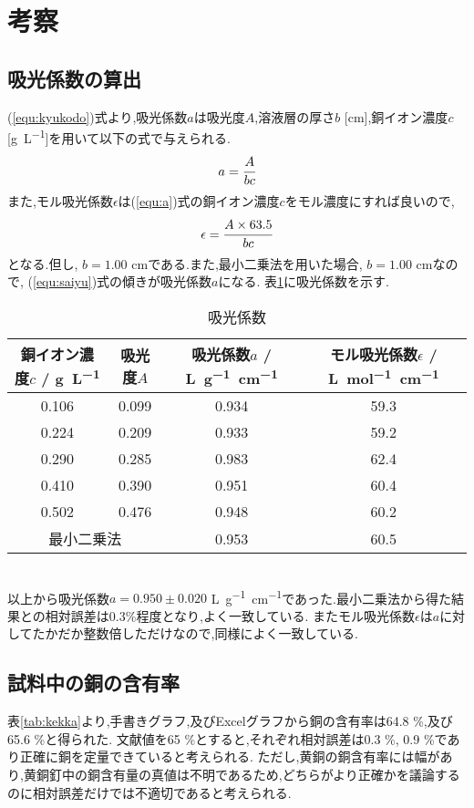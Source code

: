 \section{考察}
\subsection{吸光係数の算出}
\label{sec:kyuko}
(\ref{equ:kyukodo})式より,吸光係数$a$は吸光度$A$,溶液層の厚さ$b$ [\si{\centi\meter}],銅イオン濃度$c$ [\si{\gram.L^{-1}}]を用いて以下の式で与えられる.
\begin{align}
  \label{equ:a}
  a=\cfrac{A}{bc}
\end{align}
また,モル吸光係数$\epsilon$は(\ref{equ:a})式の銅イオン濃度$c$をモル濃度にすれば良いので,
\begin{align}
  \label{equ:epsilon}
  \epsilon=\cfrac{A\times63.5}{bc}
\end{align}
となる.但し, $b=1.00$ \si{\centi\meter}である.また,最小二乗法を用いた場合, $b=1.00$ \si{\centi\meter}なので, (\ref{equ:saiyu})式の傾きが吸光係数$a$になる.
表\ref{tab:kyukokeisu}に吸光係数を示す.
\begin{table}[h]
   \caption{吸光係数}
   \label{tab:kyukokeisu}
   \centering
   \begin{tabular}{cc|cc}
     \hline
     銅イオン濃度$c$ / \si{\gram.L^{-1}}&吸光度$A$&吸光係数$a$ / \si{L.\gram^{-1}.\centi\meter^{-1}}&モル吸光係数$\epsilon$ / \si{L.\mole^{-1}.\centi\meter^{-1}}\\
     \hline \hline
     0.106 &  0.099  &  0.934  &  59.3\\
     0.224 &  0.209  &  0.933  &  59.2\\
     0.290 &  0.285  &  0.983  &  62.4\\
     0.410 &  0.390  &  0.951  &  60.4\\
     0.502 &  0.476  &  0.948  &  60.2\\
     \hline
     \multicolumn{2}{c|}{最小二乗法}&0.953&60.5\\
     \hline
   \end{tabular}
\end{table}\\
以上から吸光係数$a=0.950\pm0.020$ \si{L.\gram^{-1}.\centi\meter^{-1}}であった.最小二乗法から得た結果との相対誤差は0.3\%程度となり,よく一致している.
またモル吸光係数$\epsilon$は$a$に対してたかだか整数倍しただけなので,同様によく一致している.
\subsection{試料中の銅の含有率}
\label{sec:ganyu}
表\ref{tab:kekka}より,手書きグラフ,及びExcelグラフから銅の含有率は64.8 \%,及び65.6 \%と得られた.
文献値を65 \%とすると,それぞれ相対誤差は0.3 \%, 0.9 \%であり正確に銅を定量できていると考えられる.
ただし,黄銅の銅含有率には幅があり\cite{kiso},黄銅釘中の銅含有量の真値は不明であるため,どちらがより正確かを議論するのに相対誤差だけでは不適切であると考えられる.
